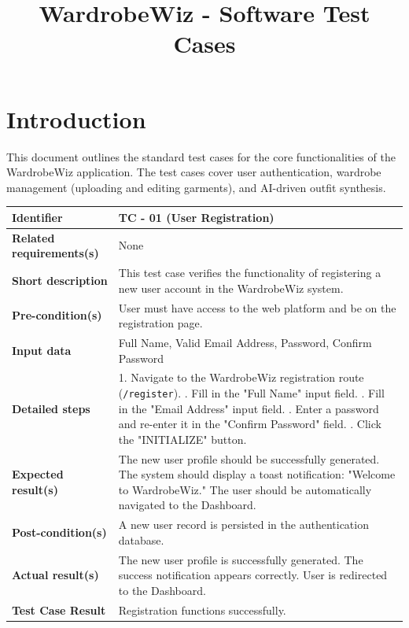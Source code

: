\documentclass{article}
\title{WardrobeWiz - Software Test Cases}
\author{}
\date{}
\begin{document}
\maketitle

\section*{Introduction}
This document outlines the standard test cases for the core functionalities of the WardrobeWiz application. The test cases cover user authentication, wardrobe management (uploading and editing garments), and AI-driven outfit synthesis.

\vspace{1em}

\begin{table}[h!]
\centering
\renewcommand{\arraystretch}{1.5}
\begin{tabularx}{\textwidth}{|l|X|}
\hline
\textbf{Identifier} & TC - 01 (User Registration) \\ \hline
\textbf{Related requirements(s)} & None \\ \hline
\textbf{Short description} & This test case verifies the functionality of registering a new user account in the WardrobeWiz system. \\ \hline
\textbf{Pre-condition(s)} & User must have access to the web platform and be on the registration page. \\ \hline
\textbf{Input data} & Full Name, Valid Email Address, Password, Confirm Password \\ \hline
\textbf{Detailed steps} & 
1. Navigate to the WardrobeWiz registration route (\texttt{/register}). \newline
2. Fill in the "Full Name" input field. \newline
3. Fill in the "Email Address" input field. \newline
4. Enter a password and re-enter it in the "Confirm Password" field. \newline
5. Click the "INITIALIZE" button. \\ \hline
\textbf{Expected result(s)} & 
The new user profile should be successfully generated. \newline
The system should display a toast notification: "Welcome to WardrobeWiz." \newline
The user should be automatically navigated to the Dashboard. \\ \hline
\textbf{Post-condition(s)} & A new user record is persisted in the authentication database. \\ \hline
\textbf{Actual result(s)} & 
The new user profile is successfully generated. \newline
The success notification appears correctly. \newline
User is redirected to the Dashboard. \\ \hline
\textbf{Test Case Result} & Registration functions successfully. \\ \hline
\end{tabularx}
\end{table}
\end{document}
